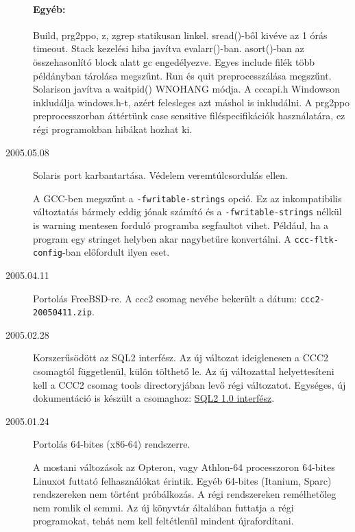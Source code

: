 \begin{description}
  \paragraph{Egyéb:}
    Build, prg2ppo, z, zgrep statikusan linkel.
    sread()-ből kivéve az 1 órás timeout.
    Stack kezelési hiba javítva evalarr()-ban.
    asort()-ban az összehasonlító block alatt gc engedélyezve.
    Egyes include filék több példányban tárolása megszűnt.
    Run és quit preprocesszálása megszűnt.
    Solarison javítva a waitpid() WNOHANG módja.
    A cccapi.h Windowson inkludálja windows.h-t, 
    azért felesleges azt máshol is inkludálni.
    A prg2ppo preprocesszorban áttértünk case sensitive
    filéspecifikációk használatára, ez régi programokban 
    hibákat hozhat ki.

\label{20050508}
\item[2005.05.08]
    Solaris port karbantartása. 
    Védelem veremtúlcsordulás ellen.
    
    A GCC-ben megszűnt a \verb!-fwritable-strings! opció.
    Ez az inkompatibilis változtatás bármely eddig jónak számító
    és a \verb!-fwritable-strings! nélkül is warning mentesen forduló 
    programba segfaultot vihet. Például, ha a program egy stringet 
    helyben akar nagybetűre konvertálni. A \verb!ccc-fltk-config!-ban 
    előfordult ilyen eset.

\label{FREEBSD}
\item[2005.04.11]
    Portolás FreeBSD-re. 
    A ccc2 csomag nevébe bekerült a dátum: \verb!ccc2-20050411.zip!.

\label{SQL2}
\item[2005.02.28]
    Korszerűsödött az SQL2 interfész. Az új változat 
    ideiglenesen a CCC2 csomagtól függetlenül, külön tölthető le.
    Az új változattal helyettesíteni kell a CCC2 csomag tools 
    directoryjában levő régi változatot. Egységes, új dokumentáció 
    is készült a csomaghoz: 
    \href{http://ok.comfirm.hu/ccc2/sql2.html}{SQL2 1.0 interfész}.

\label{64BIT}
\item[2005.01.24]
    Portolás 64-bites (x86-64) rendszerre.
    
    A mostani változások az Opteron, vagy Athlon-64 
    processzoron 64-bites Linuxot futtató felhasználókat érintik. 
    Egyéb 64-bites (Itanium, Sparc) rendszereken nem történt próbálkozás.  
    A régi rendszereken remélhetőleg nem romlik el semmi.
    Az új könyvtár általában futtatja a régi programokat, tehát nem kell
    feltétlenül mindent újrafordítani.
    

\end{description}
